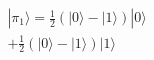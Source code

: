 \documentclass[preview]{standalone}
\begin{document}
\begin{align*}
|\pi_1 \rangle = \frac{1}{2} ( |0\rangle - |1\rangle ) |0\rangle \\ + \frac{1}{2}( |0\rangle - |1\rangle )|1\rangle
\end{align*}
\end{document}
